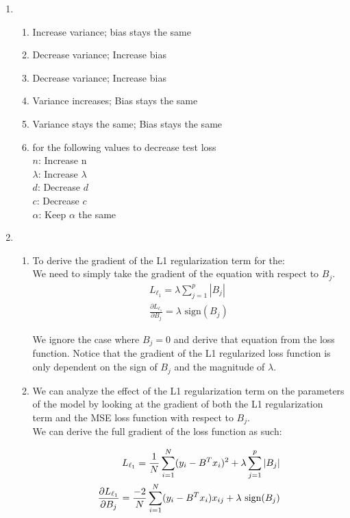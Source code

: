 \documentclass[12pt]{article}
\begin{document}
\begin{enumerate}
\item 
\begin{enumerate}
\item Increase variance; bias stays the same
\item Decrease variance; Increase bias
\item Decrease variance; Increase bias 
\item Variance increases; Bias stays the same 
\item Variance stays the same; Bias stays the same 
\item for the following values to decrease test loss\\
    $n$: Increase n \\ 
    $\lambda$: Increase $\lambda$ \\ 
    $d$: Decrease $d$ \\ 
    $c$: Decrease $c$ \\ 
    $\alpha$: Keep $\alpha$ the same 
\end{enumerate}

\item
\begin{enumerate}
\item To derive the gradient of the L1 regularization term for the: \\ 
We need to simply take the gradient of the equation with respect to $B_j$. 
\begin{align}
  L_{\ell_1} = \lambda \sum_{j=1}^{p} |B_j| \\ 
  \frac{\partial L_{\ell_1}}{\partial B_j} = \lambda \text{ sign} (B_j)
\end{align}

We ignore the case where $B_j = 0$ and derive that equation from the loss function. Notice that the gradient of the L1 regularized loss function
is only dependent on the sign of $B_j$ and the magnitude of $\lambda$.

\item  We can analyze the effect of the L1 regularization term on the parameters of the model by looking 
at the gradient of both the L1 regularization term and the MSE loss function with respect to $B_j$. \\ 

We can derive the full gradient of the loss function as such: 

\begin{align}
  L_{\ell_1} = \frac{1}{N} \sum_{i=1}^{N} (y_i - B^T x_i)^2 + \lambda \sum_{j=1}^{p} |B_j| \notag \\ 
  \frac{\partial L_{\ell_1}}{\partial B_j} = \frac{-2}{N} \sum_{i=1}^{N} (y_i - B^T x_i)x_{ij} + \lambda \text{ sign}(B_j) \notag
\end{align}


\end{enumerate}
\end{enumerate}
\end{document}
